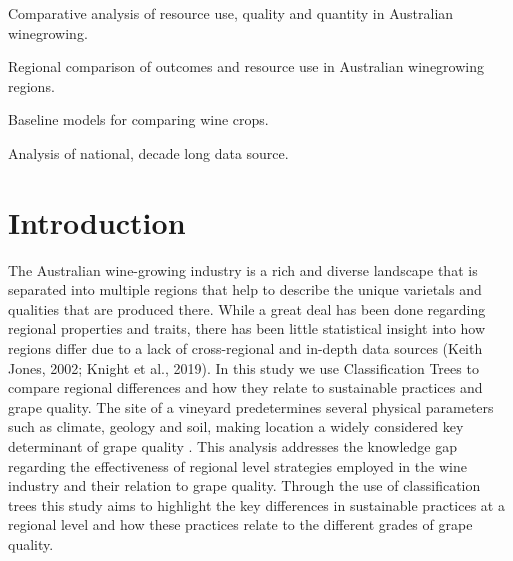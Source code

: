 \documentclass[review,12pt,authoryear]{elsarticle}
\begin{document}
\begin{linenumbers}
\begin{frontmatter}
\begin{highlights}
  \item Comparative analysis of resource use, quality and quantity in Australian winegrowing.
  \item Regional comparison of outcomes and resource use in Australian winegrowing regions.
  \item Baseline models for comparing wine crops.
  \item Analysis of national, decade long data source.
\end{highlights}
\end{frontmatter}


\section{Introduction}

%
%
%   
%

The Australian wine-growing industry is a rich and diverse landscape that is separated into multiple regions that help to describe the unique varietals and qualities that are produced there. While a great deal has been done regarding regional properties and traits, there has been little statistical insight into how regions differ due to a lack of cross-regional and in-depth data sources (Keith Jones, 2002; Knight et al., 2019). In this study we use Classification Trees to compare regional differences and how they relate to sustainable practices and grape quality.
The site of a vineyard predetermines several physical parameters such as climate, geology and soil, making location a widely considered key determinant of grape quality \citep{abbalDecisionSupportSystem2016,agostaRegionalClimateVariability2012,fragaMultivariateClusteringViticultural2017}. This analysis addresses the knowledge gap regarding the effectiveness of regional level strategies employed in the wine industry and their relation to grape quality. Through the use of classification trees this study aims to highlight the key differences in sustainable practices at a regional level and how these practices relate to the different grades of grape quality.
  

\end{linenumbers}
\end{document}
